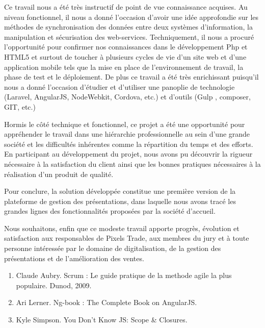 \documentclass[12pt, ChapStyle1, oneside]{./Styles/Dea_Gsm}
\begin{document}
Ce travail nous a été très instructif de point de vue connaissance acquises.
Au niveau fonctionnel, il nous a donné l’occasion d’avoir une idée approfondie sur les méthodes de synchronisation des données entre deux systèmes d’information, la manipulation et sécurisation des web-services. Techniquement, il nous a procuré l’opportunité pour confirmer nos connaissances dans le développement Php et HTML5 et surtout de toucher à plusieurs cycles de vie d’un site web et d’une application mobile tels que la mise en place de l’environnement de travail, la phase de test et le déploiement.
De plus ce travail a été très enrichissant puisqu’il nous a donné l’occasion d’étudier et d’utiliser une panoplie de technologie (Laravel, AngularJS, NodeWebkit, Cordova, etc.) et d’outils (Gulp , composer, GIT, etc.)


Hormis le côté technique et fonctionnel, ce projet a été une opportunité pour appréhender le travail dans une hiérarchie professionnelle au sein d’une grande société et les difficultés inhérentes comme la répartition du temps et des efforts. En participant au développement du projet, nous avons pu découvrir la rigueur nécessaire à la satisfaction du client ainsi que les bonnes pratiques nécessaires à la réalisation d’un produit de qualité.



Pour conclure, la solution développée constitue une première version de la plateforme de gestion des présentations, dans laquelle nous avons tracé les grandes lignes des fonctionnalités proposées par la société d'accueil.


Nous souhaitons, enfin que ce modeste travail apporte progrès, évolution et satisfaction aux responsables de Pixels Trade, aux membres du jury et à toute personne intéressée par le domaine de digitalisation, de la gestion des présentations et de l’amélioration des ventes.
\large
\vspace{6mm}
\begin{enumerate}
\item Claude Aubry. Scrum : Le guide pratique de la methode agile la plus populaire. Dunod, 2009.
\item Ari Lerner. Ng-book : The Complete Book on AngularJS.
\item Kyle Simpson. You Don't Know JS: Scope \& Closures.
\end{enumerate}


\end{document}
